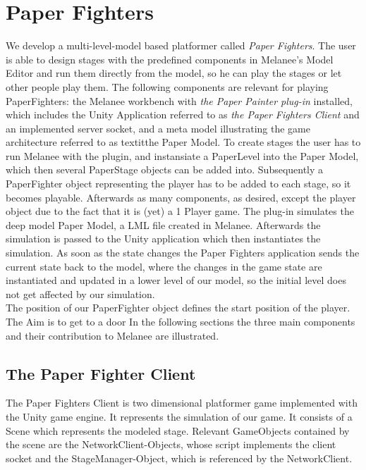 \chapter{Paper Fighters}

We develop a multi-level-model based platformer called \textit{Paper Fighters}.
The user is able to design stages with the predefined components in Melanee's Model Editor and run them directly from the model, so he can play the stages or let other people play them. The following components are relevant for playing PaperFighters: the Melanee workbench with \textit{the Paper Painter plug-in} installed, which includes the Unity Application referred to as \textit{the Paper Fighters Client} and an implemented server socket, and a meta model illustrating the game architecture referred to as textit{the Paper Model}.
To create stages the user has to run Melanee with the plugin, and instansiate a PaperLevel into the Paper Model, which then several PaperStage objects can be added into. Subsequently a PaperFighter object representing the player has to be added to each stage, so it becomes playable. Afterwards as many components, as desired, except the player object due to the fact that it is (yet) a 1 Player game.
The plug-in simulates the deep model Paper Model, a LML file created in Melanee. Afterwards the simulation is passed to the Unity application which then instantiates the simulation. As soon as the state changes the Paper Fighters application sends the current state back to the model, where the changes in the game state are instantiated and updated in a lower level of our model, so the initial level does not get affected by our simulation.\\
The position of our PaperFighter object defines the start position of the player. The Aim is to get to a door
In the following sections the three main components and their contribution to Melanee are illustrated.

\section{The Paper Fighter Client}
The Paper Fighters Client is two dimensional platformer game implemented with the Unity game engine. It represents the simulation of our game. It consists of a Scene which represents the modeled stage. Relevant GameObjects contained by the scene are the NetworkClient-Objects, whose script implements the client socket and the StageManager-Object, which is referenced by the NetworkClient.

